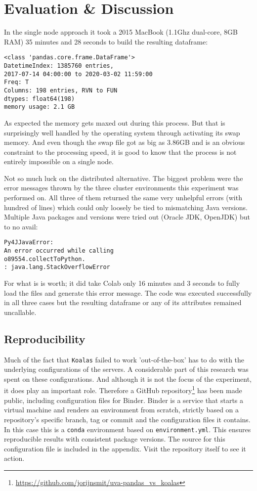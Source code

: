 \section{Evaluation \& Discussion}

In the single node approach it took a 2015 MacBook (1.1Ghz dual-core, 8GB RAM) 35 minutes and 28 seconds to build the resulting dataframe:

\begin{verbatim}
<class 'pandas.core.frame.DataFrame'>
DatetimeIndex: 1385760 entries,
2017-07-14 04:00:00 to 2020-03-02 11:59:00
Freq: T
Columns: 198 entries, RVN to FUN
dtypes: float64(198)
memory usage: 2.1 GB
\end{verbatim}

As expected the memory gets maxed out during this process. But that is surprisingly well handled by the operating system through activating its swap memory. And even though the swap file got as big as 3.86GB and is an obvious constraint to the processing speed, it is good to know that the process is not entirely impossible on a single node.

Not so much luck on the distributed alternative. The biggest problem were the error messages thrown by the three cluster environments this experiment was performed on. All three of them returned the same very unhelpful errors (with hundred of lines) which could only loosely be tied to mismatching Java versions. Multiple Java packages and versions were tried out (Oracle JDK, OpenJDK) but to no avail:

\begin{verbatim}
Py4JJavaError:
An error occurred while calling
o89554.collectToPython.
: java.lang.StackOverflowError    
\end{verbatim}

For what is is worth; it did take Colab only 16 minutes and 3 seconds to fully load the files and generate this error message. The code was executed successfully in all three cases but the resulting dataframe or any of its attributes remained uncallable.

\subsection{Reproducibility}

Much of the fact that \texttt{Koalas} failed to work 'out-of-the-box' has to do with the underlying configurations of the servers. A considerable part of this research was spent on these configurations. And although it is not the focus of the experiment, it does play an important role. Therefore a GitHub repository\footnote{\url{https://github.com/jorijnsmit/uva-pandas\_vs\_koalas}} has been made public, including configuration files for Binder. Binder is a service that starts a virtual machine and renders an environment from scratch, strictly based on a repository's specific branch, tag or commit and the configuration files it contains. In this case this is a \texttt{conda} environment based on \texttt{environment.yml}. This ensures reproducible results with consistent package versions. The source for this configuration file is included in the appendix. Visit the repository itself to see it action.

